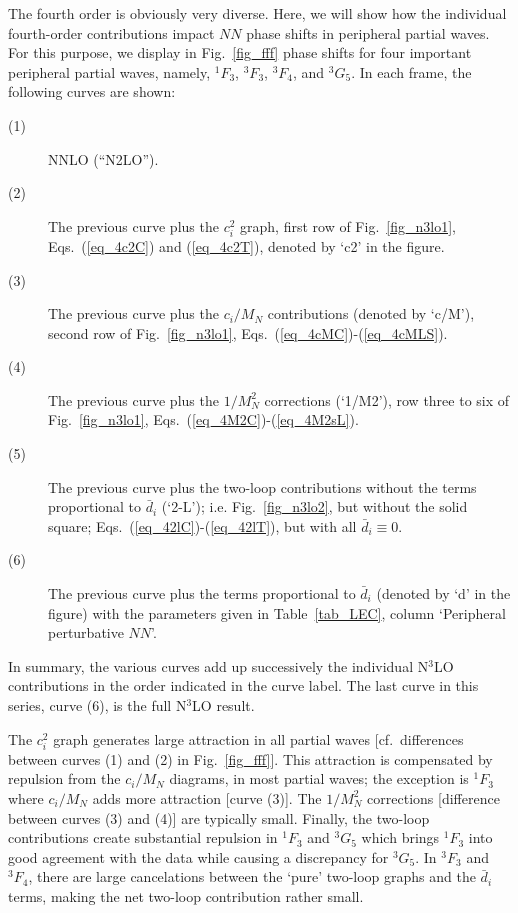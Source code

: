 \documentclass[sort&compress,preprint,3p]{elsarticle}
\begin{document}
The fourth order is obviously very diverse.
Here, we will show how the individual fourth-order contributions
impact $NN$ phase shifts in peripheral partial waves.
For this purpose, we display in 
Fig.~\ref{fig_fff} 
phase shifts
for four important peripheral partial waves, namely,
$^1F_3$, $^3F_3$, $^3F_4$, and $^3G_5$.
In each frame, the following curves
are shown:
\begin{description}
\item[(1)]
NNLO (``N2LO'').
\item[(2)] The previous curve plus
the $c_i^2$ graph, first row of 
Fig.~\ref{fig_n3lo1},
Eqs.~(\ref{eq_4c2C}) and (\ref{eq_4c2T}),
denoted by `c2' 
in the figure. 
\item[(3)] The previous curve plus
the $c_i/M_N$ contributions (denoted by `c/M'),
second row of Fig.~\ref{fig_n3lo1},
Eqs.~(\ref{eq_4cMC})-(\ref{eq_4cMLS}). 
\item[(4)] The previous curve plus
the $1/M^2_N$ corrections (`1/M2'),
row three to six of
Fig.~\ref{fig_n3lo1},
Eqs.~(\ref{eq_4M2C})-(\ref{eq_4M2sL}). 
\item[(5)] The previous curve plus
the two-loop contributions without the terms proportional
to $\bar{d}_i$ (`2-L'); i.e.
Fig.~\ref{fig_n3lo2}, but without the solid square;
Eqs.~(\ref{eq_42lC})-(\ref{eq_42lT}), but with
all $\bar{d}_i \equiv 0$. 
\item[(6)] The previous curve plus
the terms proportional
to $\bar{d}_i$ (denoted by `d' in the figure)
with the parameters given in Table~\ref{tab_LEC},
column `Peripheral perturbative $NN$'.
\end{description}
In summary, the various curves add up
successively
the individual N$^3$LO contributions 
in the order indicated in the curve label.
The last curve in this series, curve (6),
is the full N$^3$LO result.

The $c_i^2$ graph generates large attraction in all partial
waves [cf.\ differences between curves (1) and (2) in 
Fig.~\ref{fig_fff}].
This attraction is compensated by repulsion from the
$c_i/M_N$ diagrams, in most partial waves; the exception
is $^1F_3$ where $c_i/M_N$ adds more  attraction [curve (3)].
The $1/M_N^2$ corrections [difference between curves (3)
and (4)] are typically small.
Finally, the two-loop contributions create substantial repulsion
in $^1F_3$ and $^3G_5$ which brings $^1F_3$ into good agreement
with the data while causing a discrepancy for $^3G_5$. 
In $^3F_3$ and $^3F_4$, there are large cancelations
between the `pure' two-loop graphs and the $\bar{d}_i$ terms,
making the net two-loop contribution rather small.
\end{document}
